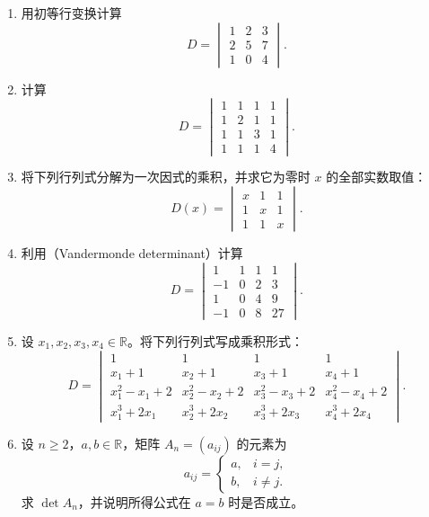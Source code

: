\documentclass[UTF8,12pt,a4paper,fontset=fandol]{ctexart}
\begin{document}
\begin{enumerate}[label=\arabic*.,resume=detquestions]

\item\label{q:numeric-three}
用初等行变换计算
\[
D=\begin{vmatrix}1&2&3\\2&5&7\\1&0&4\end{vmatrix}.
\]

\item\label{q:numeric-four}
计算
\[
D=\begin{vmatrix}
1&1&1&1\\1&2&1&1\\1&1&3&1\\1&1&1&4
\end{vmatrix}.
\]

\item\label{q:parameter-three}
将下列行列式分解为一次因式的乘积，并求它为零时 $x$ 的全部实数取值：
\[
D(x)=\begin{vmatrix}x&1&1\\1&x&1\\1&1&x\end{vmatrix}.
\]

\item\label{q:vandermonde-numeric}
利用（Vandermonde determinant）计算
\[
D=\begin{vmatrix}
1&1&1&1\\-1&0&2&3\\1&0&4&9\\-1&0&8&27
\end{vmatrix}.
\]

\item\label{q:polynomial-four}
设 $x_1,x_2,x_3,x_4\in\mathbb R$。将下列行列式写成乘积形式：
\[
D=\begin{vmatrix}
1&1&1&1\\
x_1+1&x_2+1&x_3+1&x_4+1\\
x_1^2-x_1+2&x_2^2-x_2+2&x_3^2-x_3+2&x_4^2-x_4+2\\
x_1^3+2x_1&x_2^3+2x_2&x_3^3+2x_3&x_4^3+2x_4
\end{vmatrix}.
\]

\item\label{q:constant-off-diagonal}
设 $n\geq2$，$a,b\in\mathbb R$，矩阵 $A_n=(a_{ij})$ 的元素为
\[
a_{ij}=\begin{cases}a,&i=j,\\b,&i\ne j.\end{cases}
\]
求 $\det A_n$，并说明所得公式在 $a=b$ 时是否成立。


\end{enumerate}
\end{document}
